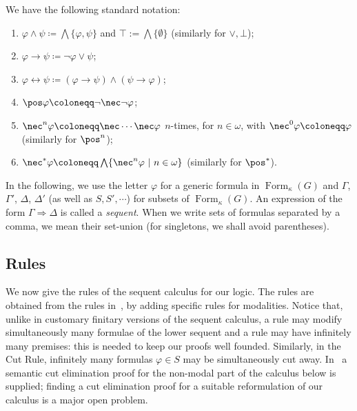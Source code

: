 \documentclass{article}
\theoremstyle{definition}
\DeclareMathOperator{\Formulas}{Form}
\begin{document}
We have the following standard notation:
\begin{enumerate}
    \item $\varphi \wedge \psi \coloneqq \bigwedge \{\varphi,\psi\}$ and $\top:=\bigwedge \{\emptyset\}$ (similarly for $\vee, \bot$);
    \item $\varphi \rightarrow \psi \coloneqq \neg \varphi \vee \psi$;
    \item $\varphi \leftrightarrow \psi \coloneqq (\varphi \rightarrow \psi) \wedge (\psi \rightarrow \varphi)$;
    \item $\pos \varphi \coloneqq \neg \nec \neg \varphi$;
    \item $\nec^n \varphi \coloneqq \nec \cdots \nec \varphi$ $n$-times, for $n \in \omega$, with $\nec^0 \varphi \coloneqq \varphi$ (similarly for $\pos^n$);
    \item $\nec^* \varphi \coloneqq \bigwedge \{\nec^n \varphi\ \vert\ n \in \omega\}$ (similarly for $\pos^*$).
\end{enumerate}

In the following, we use the letter $\varphi$ for a generic formula in $\Formulas_\kappa(G)$ and $\Gamma$, $\Gamma'$, $\Delta$, $\Delta'$ (as well as $S, S',\cdots$) for subsets of $\Formulas_\kappa(G)$. An expression of the form $\Gamma \Rightarrow \Delta$ is called a \emph{sequent}. When we write sets of formulas  separated by a comma, we mean their set-union (for singletons, we shall avoid parentheses).

\subsection{Rules}

We now give the rules of the sequent calculus for our logic.
The rules are obtained from the rules in~\cite[Ch.4,\S 22]{Tak}, by adding specific rules for modalities. Notice that, unlike in customary finitary versions of the sequent calculus, a rule may modify simultaneously many formulae of the lower sequent and a rule may have infinitely many premises: this is needed to keep our proofs well founded.
Similarly, in the Cut Rule, infinitely many formulas $\varphi \in S$ may be simultaneously cut away. 
In~\cite[Ch.4, Thm. 22.17]{Tak} a semantic cut elimination proof for the non-modal part of the calculus below is supplied; finding a cut elimination proof for a suitable reformulation of our calculus is a major open problem.
\end{document}
